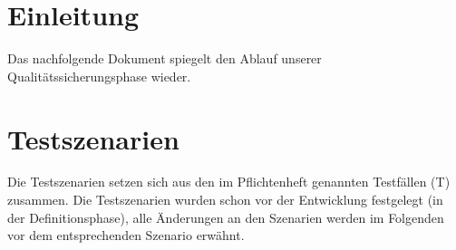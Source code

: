 \documentclass[a4paper,12pt]{article}
\title{\projektName}
\date{\today}
\author{Tec O'Brain}
\newcommand{\testok}[0]{
	\cellcolor{green!25} OK
}
\begin{document}
\setcounter{page}{2}
\tableofcontents          %
\clearpage
{}

\section{Einleitung}
Das nachfolgende Dokument spiegelt den Ablauf unserer Qualitätssicherungsphase wieder.


\section{Testszenarien}

Die Testszenarien setzen sich aus den im Pflichtenheft genannten Testfällen (T) zusammen.
Die Testszenarien wurden schon vor der Entwicklung festgelegt (in der Definitionsphase), alle Änderungen an den Szenarien werden im Folgenden vor dem entsprechenden Szenario erwähnt.
\end{document}
